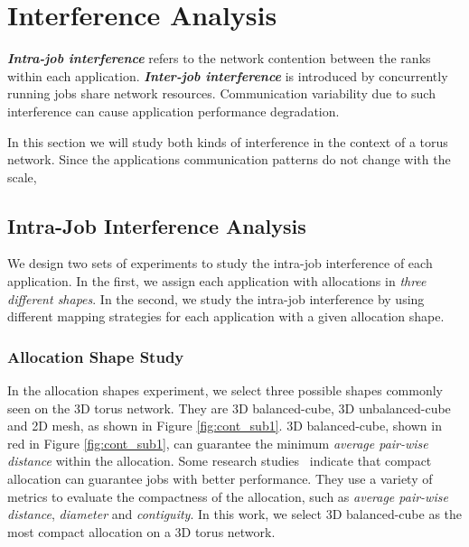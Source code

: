 \section{Interference Analysis}
\label{sec:interference}

\textbf{\emph{Intra-job interference}} refers to the network 
contention between the ranks within each application. 
\textbf{\emph{Inter-job interference}} is introduced by concurrently 
running jobs share network resources. 
Communication variability due to such interference can 
cause application performance degradation.

In this section we will study both kinds of interference 
in the context of a torus network. 
Since the applications communication patterns do not change with the scale,


\subsection{Intra-Job Interference Analysis}
\label{sec: introjob}

We design two sets of experiments to study the 
intra-job interference of each application. 
In the first, 
we assign each application with allocations in \emph{three different shapes}. 
In the second, 
we study the intra-job interference by using different 
mapping strategies for each application with a given allocation shape. 



\subsubsection{Allocation Shape Study}

In the allocation shapes experiment, 
we select three possible shapes commonly seen on the 3D torus network. 
They are 3D balanced-cube, 3D unbalanced-cube and 2D mesh, 
as shown in Figure \ref{fig:cont_sub1}.
3D balanced-cube, shown in red in Figure \ref{fig:cont_sub1}, 
can guarantee the minimum \emph{average pair-wise distance} within the allocation. 
Some research studies~\cite{leung,abhinav-sc13} indicate that 
compact allocation can guarantee jobs with better performance. 
They use a variety of metrics to evaluate the compactness of the allocation, 
such as \emph{average pair-wise distance}, \emph{diameter} and \emph{contiguity}. 
In this work, we select 3D balanced-cube as the most compact allocation on a 3D torus network.


